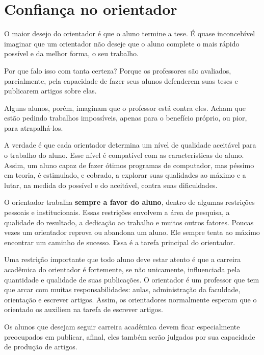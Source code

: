 \section{Confiança no orientador}


O maior desejo do orientador é que o aluno termine a tese. É quase inconcebível imaginar que um orientador não deseje que o aluno complete o mais rápido possível e da melhor forma, o seu trabalho. 

Por que falo isso com tanta certeza? Porque os professores são avaliados, parcialmente, pela capacidade de fazer seus alunos defenderem suas teses e publicarem artigos sobre elas.

Alguns alunos, porém, imaginam que o professor está contra eles. Acham que estão pedindo trabalhos impossíveis, apenas para o benefício próprio, ou pior, para atrapalhá-los.

A verdade é que cada orientador determina um nível de qualidade aceitável para o trabalho do aluno. Esse nível é compatível com as características do aluno. 
Assim, um aluno capaz de fazer ótimos programas de computador, mas péssimo em teoria, é estimulado, e cobrado, a explorar suas qualidades ao máximo e a lutar, na medida do possível e do aceitável, contra suas dificuldades.

O orientador trabalha \textbf{sempre a favor do aluno}, dentro de algumas restrições pessoais e institucionais. 
Essas restrições envolvem a área de pesquisa, a qualidade do resultado, a dedicação ao trabalho e muitos outros fatores. 
Poucas vezes um orientador reprova ou abandona um aluno.
 Ele sempre tenta ao máximo encontrar um caminho de sucesso. 
 Essa é a tarefa principal do orientador.

Uma restrição importante que todo aluno deve estar atento é que a carreira acadêmica do orientador é fortemente, se não unicamente, influenciada pela quantidade e qualidade de suas publicações. 
O orientador é um professor que tem que arcar com muitas responsabilidades: aulas, administração da faculdade, orientação e escrever artigos. 
Assim, os orientadores normalmente esperam que o orientado os auxiliem na tarefa de escrever artigos. 

Os alunos que desejam seguir carreira acadêmica devem ficar especialmente preocupados em publicar, afinal, eles também serão julgados por sua capacidade de produção de artigos.


